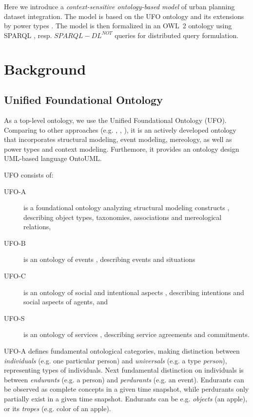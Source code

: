 \documentclass{lncs-template/llncs}
\begin{document}
Here we introduce a \emph{context-sensitive ontology-based model} of urban planning dataset integration. The model is based on the UFO ontology  \cite{guizzardi2005ontological} and its extensions by power types \cite{guizzardi2015powertypes}. The model is then formalized in an OWL~2 \cite{owl2-overview} ontology using SPARQL \cite{2013sparql}, resp. $SPARQL-DL^{NOT}$ \cite{Kremen:2012:EOQ:2607597.2607601} queries for distributed query formulation.


\section{Background}

\subsection{Unified Foundational Ontology}

As a top-level ontology, we use the Unified Foundational Ontology (UFO). Comparing to other approaches (e.g. \cite{ggmos2002sod}, \cite{gs2009sstdso}, \cite{np2001tsuo}), it is an actively developed ontology that incorporates structural modeling, event modeling, mereology, as well as power types and context modeling. Furthemore, it provides an ontology design UML-based language OntoUML.

UFO consists of:
\begin{description}
 \item[UFO-A] is a foundational ontology analyzing structural modeling constructs \cite{g2006ofscm}, describing object types, taxonomies, associations and mereological relations,
 \item[UFO-B] is an ontology of events \cite{gwaga2013tofcme}, describing events and situations
 \item[UFO-C] is an ontology of social and intentional aspects \cite{gr2005bsao}, describing intentions and social aspects of agents, and
 \item[UFO-S] is an ontology of services \cite{naagps2013tcbros}, describing service agreements and commitments.
\end{description}

UFO-A defines fundamental ontological categories, making distinction between \emph{individuals} (e.g. one particular person) and \emph{universals} (e.g. a type \emph{person}), representing types of individuals. Next fundamental distinction on individuals is between \emph{endurants} (e.g. a person) and \emph{perdurants} (e.g. an event). Endurants can be observed as complete concepts in a given time snapshot, while perdurants only partially exist in a given time snapshot. Endurants can be e.g. \emph{objects} (an apple), or its \emph{tropes} (e.g. color of an apple). 
\end{document}
